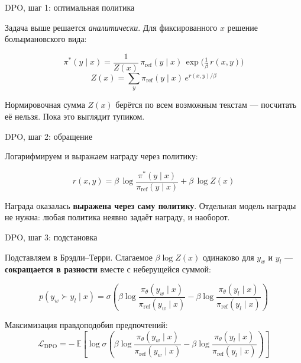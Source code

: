 \documentclass[11pt,aspectratio=169]{beamer}
\newcommand{\key}[1]{%
  \begin{center}\colorbox{boxbg}{\parbox{0.92\textwidth}{\vspace{2pt}#1\vspace{2pt}}}\end{center}}
\newcommand{\E}{\mathbb{E}}
\begin{document}
\begin{frame}{DPO, шаг 1: оптимальная политика}

Задача выше решается \emph{аналитически}. Для фиксированного $x$
решение больцмановского вида:

\vspace{0.5em}
\[
\pi^*(y\mid x) = \frac{1}{Z(x)}\,
\pi_{\text{ref}}(y\mid x)\,\exp\!\Big(\tfrac{1}{\beta}\,r(x,y)\Big)
\]
\[
Z(x) = \sum_{y}\pi_{\text{ref}}(y\mid x)\,e^{r(x,y)/\beta}
\]

\vspace{1em}
Нормировочная сумма $Z(x)$ берётся по всем возможным текстам — посчитать
её нельзя. Пока это выглядит тупиком.

\end{frame}

\begin{frame}{DPO, шаг 2: обращение}

Логарифмируем и выражаем награду через политику:

\vspace{0.5em}
\[
r(x,y) = \beta\,\log\frac{\pi^*(y\mid x)}{\pi_{\text{ref}}(y\mid x)}
+ \beta\,\log Z(x)
\]

\vspace{1.5em}
\key{Награда оказалась \textbf{выражена через саму политику}. Отдельная
модель награды не нужна: любая политика неявно задаёт награду,
и наоборот.}

\end{frame}

\begin{frame}{DPO, шаг 3: подстановка}

Подставляем в Брэдли–Терри. Слагаемое $\beta\log Z(x)$ одинаково для
$y_w$ и $y_l$ — \textbf{сокращается в разности} вместе с неберущейся суммой:

\vspace{0.5em}
\[
p(y_w \succ y_l \mid x) = \sigma\!\left(
\beta\log\frac{\pi_\theta(y_w\mid x)}{\pi_{\text{ref}}(y_w\mid x)}
-\beta\log\frac{\pi_\theta(y_l\mid x)}{\pi_{\text{ref}}(y_l\mid x)}
\right)
\]

\vspace{0.5em}
Максимизация правдоподобия предпочтений:
\[
\mathcal{L}_{\text{DPO}} = -\,\E
\left[\log\sigma\!\left(
\beta\log\frac{\pi_\theta(y_w\mid x)}{\pi_{\text{ref}}(y_w\mid x)}
-\beta\log\frac{\pi_\theta(y_l\mid x)}{\pi_{\text{ref}}(y_l\mid x)}
\right)\right]
\]

\end{frame}
\end{document}
